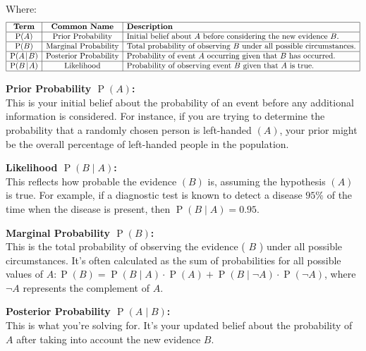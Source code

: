\documentclass[
  12 pt,
  a4paper,
]{book}
\numberwithin{equation}{section}
\theoremstyle{plain}      %
\theoremstyle{definition} %
\theoremstyle{remark}     %
\theoremstyle{note}         %
\begin{document}
Where: \[
\begin{array}{|c|c|l|}
\hline
\textbf{Term} & \textbf{Common Name} & \textbf{Description} \\
\hline
\operatorname{P}(A) & \text{Prior Probability} & \text{Initial belief about \(A\) before considering the new evidence \(B\).} \\
\hline
\operatorname{P}(B) & \text{Marginal Probability} & \text{Total probability of observing \(B\) under all possible circumstances.} \\
\hline
\operatorname{P}(A\! \mid\! B) & \text{Posterior Probability} & \text{Probability of event \(A\) occurring given that \(B\) has occurred.} \\
\hline
\operatorname{P}(B\! \mid\! A) & \text{Likelihood} & \text{Probability of observing event \(B\) given that \(A\) is true.} \\
\hline
\end{array}
\]

\textbf{Prior Probability \(\operatorname{P}(A)\):}\\
This is your initial belief about the probability of an event before any
additional information is considered. For instance, if you are trying to
determine the probability that a randomly chosen person is left-handed
\((A)\), your prior might be the overall percentage of left-handed
people in the population.

\textbf{Likelihood \(\operatorname{P}(B\! \mid\! A)\):}\\
This reflects how probable the evidence \((B)\) is, assuming the
hypothesis \((A)\) is true. For example, if a diagnostic test is known
to detect a disease \(95 \%\) of the time when the disease is present,
then \(\operatorname{P}(B\! \mid\! A)=0.95\).

\textbf{Marginal Probability \(\operatorname{P}(B)\):}\\
This is the total probability of observing the evidence ( \(B\) ) under
all possible circumstances. It's often calculated as the sum of
probabilities for all possible values of
\(A: \operatorname{P}(B)=\operatorname{P}(B\! \mid\! A) \cdot \operatorname{P}(A)+\operatorname{P}(B\! \mid\! \neg A) \cdot \operatorname{P}(\neg A)\),
where \(\neg A\) represents the complement of \(A\).

\textbf{Posterior Probability \(\operatorname{P}(A\! \mid\! B)\):}\\
This is what you're solving for. It's your updated belief about the
probability of \(A\) after taking into account the new evidence \(B\).
\end{document}
